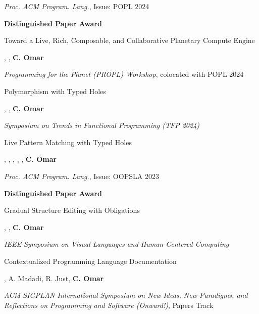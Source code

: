 \documentclass[10pt,letterpaper]{article}
\renewenvironment{itemize}{
  \begin{list}{}{
    \setlength{\leftmargin}{1.25em}
    \setlength{\itemsep}{0.25em}
    \setlength{\parskip}{0pt}
    \setlength{\parsep}{0.2em}
  }
}{
  \end{list}
}
\begin{document}
\begin{enumerate}[leftmargin=*, labelindent=6.5em, font=\bfseries]
\begin{itemize}
    \item \textit{Proc. ACM Program. Lang.}, Issue: POPL 2024
    \item \textbf{Distinguished Paper Award}
  \end{itemize}
  \item[PROPL 2024] {Toward a Live, Rich, Composable, and Collaborative Planetary Compute Engine}
  \begin{itemize}
    \item {}, , \textbf{C. Omar}
    \item \textit{Programming for the Planet (PROPL) Workshop}, colocated with POPL 2024
  \end{itemize}
  \item[TFP 2024] {Polymorphism with Typed Holes}
  \begin{itemize}
    \item {}, , \textbf{C. Omar}
    \item \textit{Symposium on Trends in Functional Programming (TFP 2024)}
  \end{itemize}
  \item[OOPSLA 2023] {Live Pattern Matching with Typed Holes}
        \begin{itemize}
          \item {}, , , , , \textbf{C. Omar}
          \item \textit{Proc. ACM Program. Lang.}, Issue: OOPSLA 2023
          \item \textbf{Distinguished Paper Award}
        \end{itemize}
  \item[VL/HCC 2023] {Gradual Structure Editing with Obligations}
        \begin{itemize}
          \item {}, , \textbf{C. Omar}
          \item \textit{IEEE Symposium on Visual Languages and Human-Centered Computing}
        \end{itemize}      
  \item[Onward! 2022] {Contextualized Programming Language Documentation}
        \begin{itemize}
          \item {}, A. Madadi, R. Just, \textbf{C. Omar}
          \item \textit{ACM SIGPLAN International Symposium on New Ideas, New Paradigms, and Reflections on Programming and Software (Onward!)}, Papers Track

\end{itemize}
\end{enumerate}
\end{document}
